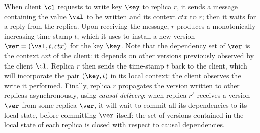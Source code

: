 When client $\cl$ requests to write key $\key$ to replica $r$, it sends a message containing the value $\val$ to be written and its context $ctx$ to $r$; then  
it waits for a reply from the replica. 
Upon receiving the message, $r$ produces a monotonically increasing time-stamp $t$, which it uses to install a new version $\ver = (\val, t, ctx)$ for the key $\key$. 
Note that the dependency set of $\ver$ is the context $cxt$ of the client: 
it depends on other versions previously observed by the client $\cl$. 
Replica $r$ then sends the time-stamp $t$ back to the client, which will incorporate the pair $(\key, t)$ in its local context: 
the client observes the write it performed. Finally, replica $r$ propagates the version written to other replicas asynchronously, 
using \emph{causal delivery}: when replica $r'$ receives a version $\ver$ from some replica $\ver$, it 
will wait to commit all its dependencies to its local state, before committing $\ver$ itself: 
the set of versions contained in the local state of each replica is closed with respect to causal dependencies.
